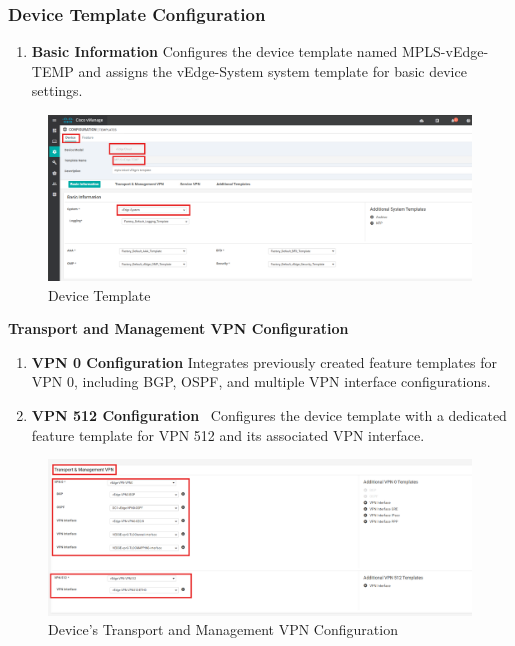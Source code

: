 \documentclass[12pt,english]{report}
\begin{document}
\subsubsection{Device Template Configuration}
\begin{enumerate}
\item \textbf{Basic Information}
Configures the device template named MPLS-vEdge-TEMP and assigns the vEdge-System system template for basic device settings.
\end{enumerate}
\begin{figure}[H]
    \centering
    \includegraphics[width= 1 \textwidth]{chapitre 3/template/dt1.png}
    \caption{Device Template}
    \label{Device Template}
\end{figure} 
\textbf{Transport and Management VPN Configuration}
\begin{enumerate}
\item \textbf{VPN 0 Configuration}
Integrates previously created feature templates for VPN 0, including BGP, OSPF, and multiple VPN interface configurations.
\item \textbf{VPN 512 Configuration} \
Configures the device template with a dedicated feature template for VPN 512 and its associated VPN interface.
\end{enumerate}
\begin{figure}[H]
    \centering
    \includegraphics[width= 1 \textwidth]{chapitre 3/template/dt2.png}
    \caption{Device's Transport and Management VPN Configuration}
    \label{Device's Transport and Management VPN Configuration}
\end{figure}
\end{document}
